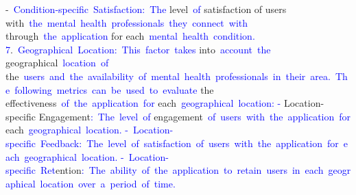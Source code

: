 \documentclass{article}
\begin{document}
\begin{tcolorbox}[colframe=black,colback=white]
{}-\textcolor{blue}{~Condition}\textcolor{blue}{-specific}\textcolor{blue}{~Satisfaction}\textcolor{blue}{:}\textcolor{blue}{~The} level\textcolor{blue}{~of} satisfaction of users with\textcolor{blue}{~the}\textcolor{blue}{~mental}\textcolor{blue}{~health}\textcolor{blue}{~professionals}\textcolor{blue}{~they}\textcolor{blue}{~connect}\textcolor{blue}{~with} through\textcolor{blue}{~the}\textcolor{blue}{~application} for each\textcolor{blue}{~mental}\textcolor{blue}{~health}\textcolor{blue}{~condition}\textcolor{blue}{.
}\textcolor{blue}{7}.\textcolor{blue}{~Ge}\textcolor{blue}{ographical}\textcolor{blue}{~Location}\textcolor{blue}{:}\textcolor{blue}{~This}\textcolor{blue}{~factor}\textcolor{blue}{~takes} into\textcolor{blue}{~account}\textcolor{blue}{~the} geographical\textcolor{blue}{~location}\textcolor{blue}{~of} the\textcolor{blue}{~users}\textcolor{blue}{~and}\textcolor{blue}{~the}\textcolor{blue}{~availability}\textcolor{blue}{~of}\textcolor{blue}{~mental}\textcolor{blue}{~health}\textcolor{blue}{~professionals}\textcolor{blue}{~in}\textcolor{blue}{~their}\textcolor{blue}{~area}\textcolor{blue}{.}\textcolor{blue}{~The}\textcolor{blue}{~following}\textcolor{blue}{~metrics}\textcolor{blue}{~can}\textcolor{blue}{~be}\textcolor{blue}{~used}\textcolor{blue}{~to}\textcolor{blue}{~evaluate} the effectiveness\textcolor{blue}{~of}\textcolor{blue}{~the}\textcolor{blue}{~application}\textcolor{blue}{~for} each\textcolor{blue}{~geographical}\textcolor{blue}{~location}\textcolor{blue}{:
}\textcolor{blue}{-} Location-specific Engagement\textcolor{blue}{:}\textcolor{blue}{~The}\textcolor{blue}{~level}\textcolor{blue}{~of} engagement\textcolor{blue}{~of}\textcolor{blue}{~users}\textcolor{blue}{~with}\textcolor{blue}{~the}\textcolor{blue}{~application}\textcolor{blue}{~for} each\textcolor{blue}{~geographical}\textcolor{blue}{~location}\textcolor{blue}{.
}\textcolor{blue}{-}\textcolor{blue}{~Location}\textcolor{blue}{-specific}\textcolor{blue}{~Feedback}\textcolor{blue}{:}\textcolor{blue}{~The}\textcolor{blue}{~level}\textcolor{blue}{~of}\textcolor{blue}{~satisfaction}\textcolor{blue}{~of}\textcolor{blue}{~users}\textcolor{blue}{~with}\textcolor{blue}{~the}\textcolor{blue}{~application}\textcolor{blue}{~for}\textcolor{blue}{~each}\textcolor{blue}{~geographical}\textcolor{blue}{~location}\textcolor{blue}{.
}\textcolor{blue}{-}\textcolor{blue}{~Location}\textcolor{blue}{-specific}\textcolor{blue}{~Ret}ention\textcolor{blue}{:}\textcolor{blue}{~The}\textcolor{blue}{~ability}\textcolor{blue}{~of}\textcolor{blue}{~the}\textcolor{blue}{~application}\textcolor{blue}{~to}\textcolor{blue}{~retain}\textcolor{blue}{~users}\textcolor{blue}{~in}\textcolor{blue}{~each}\textcolor{blue}{~geographical}\textcolor{blue}{~location}\textcolor{blue}{~over}\textcolor{blue}{~a}\textcolor{blue}{~period}\textcolor{blue}{~of}\textcolor{blue}{~time}\textcolor{blue}{.
}
\end{tcolorbox}
\end{document}
